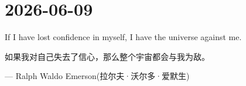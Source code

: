 \section*{2026-06-09}
If I have lost confidence in myself, I have the universe against me. \par
如果我对自己失去了信心，那么整个宇宙都会与我为敌。 \par
\hfill ---  Ralph Waldo Emerson(拉尔夫·沃尔多·爱默生) \par

